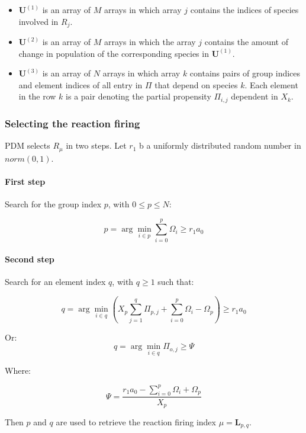     \begin{multicols}{2}
      \begin{itemize}
        \item $\mathbf{U}^{(1)}$ is an array of $M$ arrays in which array $j$ contains the indices of species involved in $R_j$.
        \item $\mathbf{U}^{(2)}$ is an array of $M$ arrays in which the array $j$ contains the amount of change in population of the corresponding species in $\mathbf{U}^{(1)}$.
        \item $\mathbf{U}^{(3)}$ is an array of $N$ arrays in which array $k$ contains pairs of group indices and element indices of all entry in $\Pi$ that depend on species $k$.
          Each element in the row $k$ is a pair denoting the partial propensity $\Pi_{i,j}$ dependent in $X_k$.
      \end{itemize}
    \end{multicols}

    \subsubsection{Selecting the reaction firing}
    PDM selects $R_\mu$ in two steps.
    Let $r_1$ b a uniformly distributed random number in $norm(0,1)$.

      \paragraph{First step}
      Search for the group index $p$, with $0\le p\le N$:

      $$p = \arg\min\limits_{i\in p}\sum\limits_{i=0}^p\Omega_i\ge r_1a_0$$

      \paragraph{Second step}
      Search for an element index $q$, with $q\ge 1$ such that:

      $$q = \arg\min\limits_{i\in q}\left(X_p\sum\limits_{j=1}^q\Pi_{p,j}+\sum\limits_{i=0}^p\Omega_i-\Omega_p\right)\ge r_1a_0$$

      Or:
      $$q = \arg\min\limits_{i\in q}\Pi_{o,j}\ge \Psi$$

      Where:

      $$\Psi = \frac{r_1a_0-\sum\limits_{i=0}^p\Omega_i+\Omega_p}{X_p}$$

      Then $p$ and $q$ are used to retrieve the reaction firing index $\mu = \mathbf{L}_{p,q}$.

